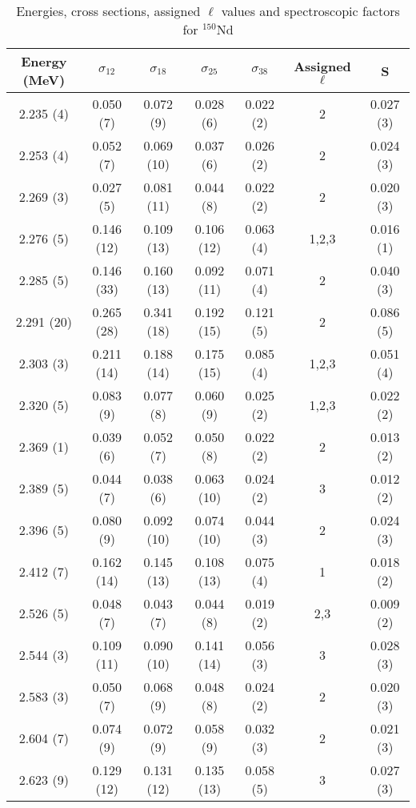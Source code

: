 \begin{table}
\caption{Energies, cross sections, assigned $\ell$ values and spectroscopic factors for $^{150}$Nd}
\begin{tabular}{c c c c c c c}
\hline \hline
Energy (MeV) & $\sigma_{12}$ & $\sigma_{18}$ & $\sigma_{25}$ & $\sigma_{38}$ & Assigned $\ell$ & S\\
\hline \hline
2.235 (4) & 0.050 (7) & 0.072 (9) & 0.028 (6) & 0.022 (2) & 2 & 0.027 (3) \\
2.253 (4) & 0.052 (7) & 0.069 (10) & 0.037 (6) & 0.026 (2) & 2 & 0.024 (3) \\
2.269 (3) & 0.027 (5) & 0.081 (11) & 0.044 (8) & 0.022 (2) & 2 & 0.020 (3) \\
2.276 (5) & 0.146 (12) & 0.109 (13) & 0.106 (12) & 0.063 (4) & 1,2,3 & 0.016 (1) \\
2.285 (5) & 0.146 (33) & 0.160 (13) & 0.092 (11) & 0.071 (4) & 2 & 0.040 (3) \\
2.291 (20) & 0.265 (28) & 0.341 (18) & 0.192 (15) & 0.121 (5) & 2 & 0.086 (5) \\
2.303 (3) & 0.211 (14) & 0.188 (14) & 0.175 (15) & 0.085 (4) & 1,2,3 & 0.051 (4) \\
2.320 (5) & 0.083 (9) & 0.077 (8) & 0.060 (9) & 0.025 (2) & 1,2,3 & 0.022 (2) \\
2.369 (1) & 0.039 (6) & 0.052 (7) & 0.050 (8) & 0.022 (2) & 2 & 0.013 (2) \\
2.389 (5) & 0.044 (7) & 0.038 (6) & 0.063 (10) & 0.024 (2) & 3 & 0.012 (2) \\
2.396 (5) & 0.080 (9) & 0.092 (10) & 0.074 (10) & 0.044 (3) & 2 & 0.024 (3) \\
2.412 (7) & 0.162 (14) & 0.145 (13) & 0.108 (13) & 0.075 (4) & 1 & 0.018 (2) \\
2.526 (5) & 0.048 (7) & 0.043 (7) & 0.044 (8) & 0.019 (2) & 2,3 & 0.009 (2) \\
2.544 (3) & 0.109 (11) & 0.090 (10) & 0.141 (14) & 0.056 (3) & 3 & 0.028 (3) \\
2.583 (3) & 0.050 (7) & 0.068 (9) & 0.048 (8) & 0.024 (2) & 2 & 0.020 (3) \\
2.604 (7) & 0.074 (9) & 0.072 (9) & 0.058 (9) & 0.032 (3) & 2 & 0.021 (3) \\
2.623 (9) & 0.129 (12) & 0.131 (12) & 0.135 (13) & 0.058 (5) & 3 & 0.027 (3) \\
\hline \hline
\end{tabular}
\label{Nd3}
\end{table}

